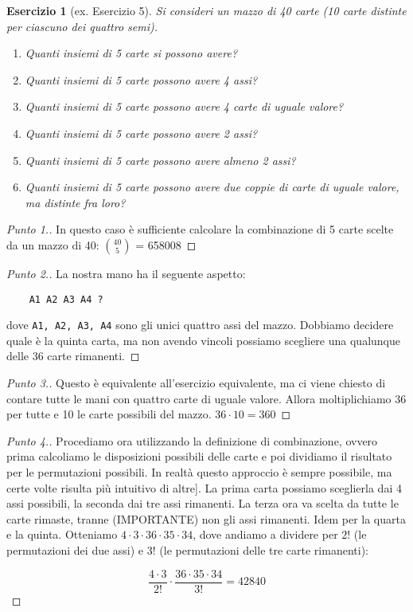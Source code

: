 \documentclass[12pt]{article}
\newtheorem{theorem}{Esercizio}
\renewcommand\qedsymbol{$\square$}
\begin{document}
\renewcommand\qedsymbol{$\square$}

\begin{theorem}[ex. Esercizio 5]
	\label{ex:carte:almeno}
	Si consideri un mazzo di 40 carte (10 carte distinte per ciascuno dei quattro semi).
	
	\begin{enumerate}
		\item Quanti insiemi di 5 carte si possono avere?
		\item Quanti insiemi di 5 carte possono avere 4 assi?
		\item Quanti insiemi di 5 carte possono avere 4 carte di uguale valore?
		\item Quanti insiemi di 5 carte possono avere 2 assi?
		\item Quanti insiemi di 5 carte possono avere almeno 2 assi?
		\item Quanti insiemi di 5 carte possono avere due coppie di carte di uguale valore, ma distinte fra loro?
	\end{enumerate}
\end{theorem}

\begin{proof}[Punto 1.]
	In questo caso è sufficiente calcolare la combinazione di 5 carte scelte da un mazzo di 40: $\binom{40}{5}$ = 658008
\end{proof}

\begin{proof}[Punto 2.]
	La nostra mano ha il seguente aspetto:
	
	\begin{verbatim}
    A1 A2 A3 A4 ?
	\end{verbatim}
	
	dove \verb=A1, A2, A3, A4= sono gli unici quattro assi del mazzo. Dobbiamo decidere quale è la quinta carta, ma non avendo vincoli possiamo scegliere una qualunque delle 36 carte rimanenti.
\end{proof}

\begin{proof}[Punto 3.]
	Questo è equivalente all'esercizio equivalente, ma ci viene chiesto di contare tutte le mani con quattro carte di uguale valore. Allora moltiplichiamo 36 per tutte e 10 le carte possibili del mazzo. $36 \cdot 10 = 360$
\end{proof}

\begin{proof}[Punto 4.]
	Procediamo ora utilizzando la definizione di combinazione, ovvero prima calcoliamo le disposizioni possibili delle carte e poi dividiamo il risultato per le permutazioni possibili. In realtà questo approccio è sempre possibile, ma certe volte risulta più intuitivo di altre]. La prima carta possiamo sceglierla dai 4 assi possibili, la seconda dai tre assi rimanenti. La terza ora va scelta da tutte le carte rimaste, tranne (IMPORTANTE) non gli assi rimanenti. Idem per la quarta e la quinta.
	Otteniamo $4 \cdot 3 \cdot 36 \cdot 35 \cdot 34$, dove andiamo a dividere per $2!$ (le permutazioni dei due assi) e $3!$ (le permutazioni delle tre carte rimanenti):
	
	\[
		\frac{4\cdot3}{2!}\cdot\frac{36\cdot35\cdot34}{3!} = 42840
    \]
\end{proof}
\end{document}
